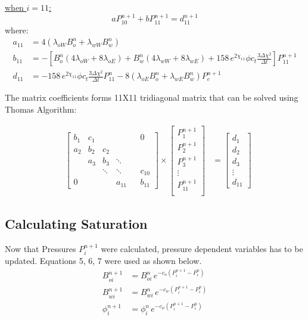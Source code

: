 \documentclass[12pt,letterpaper,titlepage]{article}
\begin{document}
\underline{when $i=11$:}\\
\begin{equation*}
a P^{n+1}_{10}+b P^{n+1}_{11} =d^{n+1}_{11}
\end{equation*}
where:
\begin{align*}
a_{11} &=4(\lambda_{oW}B_o^n+\lambda_{wW}B_w^n)\\
b_{11} &=-\left[B_o^n(4\lambda_{oW}+8\lambda_{oE})+B_w^n(4\lambda_{wW}+8\lambda_{wE})+158\,e^{2\chi_{11}}\phi c_t \frac{3\Delta\chi^2}{\Delta t}\right]P_{11}^{n+1}\\
d_{11} &=-158\,e^{2\chi_{11}}\phi c_t \frac{3\Delta\chi^2}{\Delta t}P_{11}^n- 8(\lambda_{oE}B_o^n+\lambda_{wE}B_w^n)P_{e}^{n+1}
\end{align*}

The matrix coefficients forms 11X11  tridiagonal matrix that can be solved using Thomas Algorithm:
 
 \[ \begin{aligned}
    & \begin{bmatrix} 
     b_1 & c_1 &  & &&0 \\ 
     a_2 & b_2 & c_2 && & \\
     & a_3 & b_3 & \ddots&&  \\
         &&  \ddots & \ddots && c_{10} \\
       0&&&a_{11}&& b_{11}
 \end{bmatrix} 
  \times \begin{bmatrix} 
   P^{n+1}_1        \\ 
      P^{n+1}_2        \\ 
      P^{n+1}_{3}        \\ 
      \vdots        \\ 
      P^{n+1}_{11}        \\ 
    \end{bmatrix} &= \left[\begin{array}{l}  d_1\\d_2\\d_3\\\vdots\\d_{11}  \end{array}\right]
\end{aligned}  \]

\subsection{Calculating Saturation}
Now that Pressures $P^{n+1}_{i}$ were calculated, pressure dependent variables has to be updated. Equations 5, 6, 7 were used as shown below.
\begin{align*}
B_{oi}^{n+1}&=B_{oi}^{n}\,e^{-c_o(P_i^{n+1}-P_i^n)}\\
B_{wi}^{n+1}&=B_{wi}^{n}\,e^{-c_w(P_i^{n+1}-P_i^n)}\\
\phi_i^{n+1}&=\phi_{i}^{n}\,e^{-c_\phi(P_i^{n+1}-P_i^n)}
\end{align*}
\end{document}
